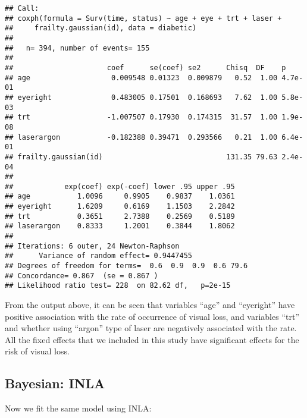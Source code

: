 \documentclass[]{article}
\newenvironment{Shaded}{\begin{snugshade}}{\end{snugshade}}
\newcommand{\DataTypeTok}[1]{\textcolor[rgb]{0.13,0.29,0.53}{#1}}
\newcommand{\DecValTok}[1]{\textcolor[rgb]{0.00,0.00,0.81}{#1}}
\newcommand{\KeywordTok}[1]{\textcolor[rgb]{0.13,0.29,0.53}{\textbf{#1}}}
\newcommand{\NormalTok}[1]{#1}
\newcommand{\OperatorTok}[1]{\textcolor[rgb]{0.81,0.36,0.00}{\textbf{#1}}}
\newcommand{\OtherTok}[1]{\textcolor[rgb]{0.56,0.35,0.01}{#1}}
\newcommand{\StringTok}[1]{\textcolor[rgb]{0.31,0.60,0.02}{#1}}
\begin{document}
\begin{verbatim}
## Call:
## coxph(formula = Surv(time, status) ~ age + eye + trt + laser + 
##     frailty.gaussian(id), data = diabetic)
## 
##   n= 394, number of events= 155 
## 
##                      coef      se(coef) se2      Chisq  DF    p      
## age                   0.009548 0.01323  0.009879   0.52  1.00 4.7e-01
## eyeright              0.483005 0.17501  0.168693   7.62  1.00 5.8e-03
## trt                  -1.007507 0.17930  0.174315  31.57  1.00 1.9e-08
## laserargon           -0.182388 0.39471  0.293566   0.21  1.00 6.4e-01
## frailty.gaussian(id)                             131.35 79.63 2.4e-04
## 
##            exp(coef) exp(-coef) lower .95 upper .95
## age           1.0096     0.9905    0.9837    1.0361
## eyeright      1.6209     0.6169    1.1503    2.2842
## trt           0.3651     2.7388    0.2569    0.5189
## laserargon    0.8333     1.2001    0.3844    1.8062
## 
## Iterations: 6 outer, 24 Newton-Raphson
##      Variance of random effect= 0.9447455 
## Degrees of freedom for terms=  0.6  0.9  0.9  0.6 79.6 
## Concordance= 0.867  (se = 0.867 )
## Likelihood ratio test= 228  on 82.62 df,   p=2e-15
\end{verbatim}

From the output above, it can be seen that variables ``age'' and
``eyeright'' have positive association with the rate of occurrence of
visual loss, and variables ``trt'' and whether using ``argon'' type of
laser are negatively associated with the rate. All the fixed effects
that we included in this study have significant effects for the risk of
visual loss.

\hypertarget{bayesian-inla}{%
\subsection{Bayesian: INLA}\label{bayesian-inla}}

Now we fit the same model using INLA:

\begin{Shaded}
\end{Shaded}
\end{document}
